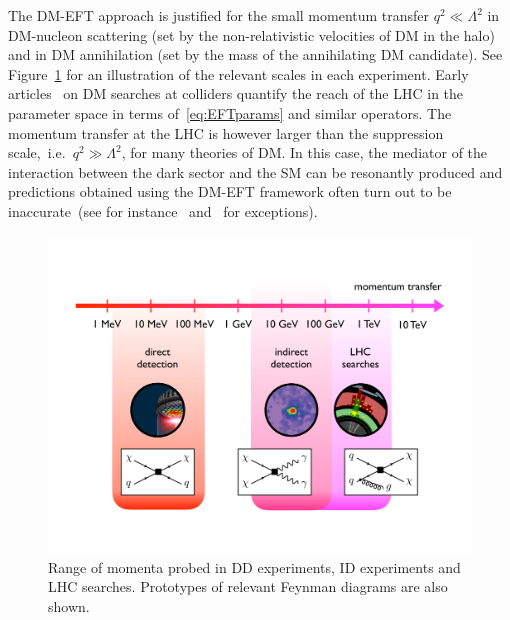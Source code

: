 \documentclass[a4paper, 11pt,notoc]{article}
\begin{document}
The DM-EFT approach is justified for the small momentum transfer $q^2\ll \Lambda^2$ in DM-nucleon scattering (set by the non-relativistic velocities of DM in the halo) and in DM annihilation (set by the mass of the annihilating DM candidate). See Figure~\ref{fig:momentumtransfer} for an illustration of the relevant scales in each experiment. Early articles~\cite{Cao:2009uw,Beltran:2010ww,Goodman:2010yf,Bai:2010hh,Goodman:2010ku,Fox:2011pm} on DM searches at colliders quantify the reach of the LHC in the parameter space in terms of~\eqref{eq:EFTparams} and similar operators. The momentum transfer at the LHC is however larger than the suppression scale,~i.e.~$q^2 \gg \Lambda^2$, for many theories of DM.  In this case, the mediator of the interaction between the dark sector and the SM can be resonantly produced and predictions  obtained using the DM-EFT framework often turn out to be inaccurate~(see for instance~\cite{Bai:2010hh,Fox:2011fx,Shoemaker:2011vi,Busoni:2013lha,Buchmueller:2013dya,Busoni:2014sya,Busoni:2014haa,Racco:2015dxa} and~\cite{Bruggisser:2016nzw,Bruggisser:2016ixa} for exceptions). 

\begin{figure}[t!]
\centering
\includegraphics[width=.85\textwidth]{figure1.pdf}
\vspace{2mm}
\caption{\label{fig:momentumtransfer} Range of momenta probed in DD experiments, ID experiments and LHC searches. Prototypes of relevant Feynman diagrams are also shown. }
\end{figure}
\end{document}
